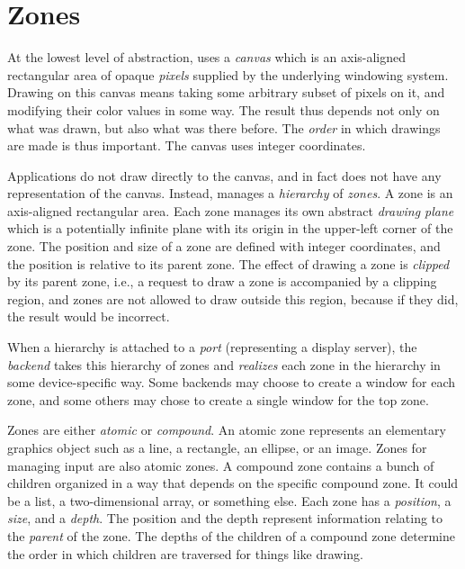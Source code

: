 \chapter{Zones}

At the lowest level of abstraction, \clim{} uses a \emph{canvas} which
is an axis-aligned rectangular area of opaque \emph{pixels} supplied by
the underlying windowing system.  Drawing on this canvas means taking
some arbitrary subset of pixels on it, and modifying their color
values in some way.  The result thus depends not only on what was
drawn, but also what was there before.  The \emph{order} in which
drawings are made is thus important.  The canvas uses integer
coordinates.

Applications do not draw directly to the canvas, and in fact \clim{}
does not have any representation of the canvas.  Instead,
\clim{} manages a \emph{hierarchy} of \emph{zones}.  A zone is an
axis-aligned rectangular area.  Each zone manages its own abstract
\emph{drawing plane} which is a potentially infinite plane with its
origin in the upper-left corner of the zone.  The position and size
of a zone are defined with integer coordinates, and the position is
relative to its parent zone.  The effect of drawing a zone is
\emph{clipped} by its parent zone, i.e., a request to draw a zone
is accompanied by a clipping region, and zones are not allowed to
draw outside this region, because if they did, the result would be
incorrect. 

When a hierarchy is attached to a \emph{port} (representing a display
server), the \emph{backend} takes this hierarchy of zones and
\emph{realizes} each zone in the hierarchy in some device-specific
way.  Some backends may choose to create a window for each zone, and
some others may chose to create a single window for the top zone. 

Zones are either \emph{atomic} or \emph{compound}.  An atomic zone
represents an elementary graphics object such as a line, a rectangle,
an ellipse, or an image.  Zones for managing input are also atomic
zones.  A compound zone contains a bunch of children organized in a
way that depends on the specific compound zone.  It could be a \cl{}
list, a \cl{} two-dimensional array, or something else.  Each zone has
a \emph{position}, a \emph{size}, and a \emph{depth}.  The position
and the depth represent information relating to the \emph{parent} of
the zone.  The depths of the children of a compound zone determine the
order in which children are traversed for things like drawing.

